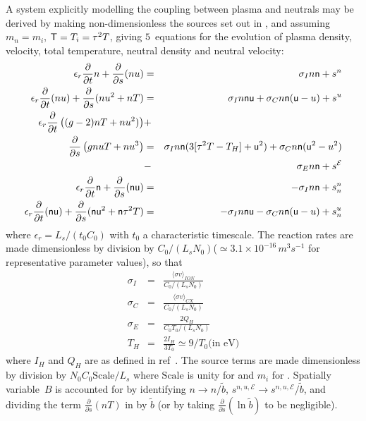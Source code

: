 A system explicitly modelling the coupling between plasma and neutrals may be derived by making
non-dimensionless the sources set out in , and assuming $m_n=m_i$, ${\sf T}=T_i=\tau^2 T$,
giving $5$~equations for the evolution of plasma density, velocity, total temperature,
neutral density and neutral velocity:
\begin{eqnarray}\label{eq:syscn}
\epsilon_r \frac{\partial}{\partial t} n + 
\frac{\partial}{\partial s} (nu)&=& \sigma_I n {\sf n}+ s^n\\
\epsilon_r \frac{\partial}{\partial t} (nu)+ 
\frac{\partial}{\partial s} (nu^2+nT)&=&
\sigma_I n {\sf n} {\sf u} + \sigma_C n {\sf n} ({\sf u}-u)+ s^u \label{eq:syscu}\\
\epsilon_r \frac{\partial}{\partial t}\left( (g-2) nT+
 nu^2) \right) &+& \nonumber\\
\frac{\partial}{\partial s} \left( g nuT +
nu^3 \right) &=& \sigma_I n {\sf n} (3[\tau^2 T -T_H]+{\sf u}^2)
+\sigma_C n {\sf n} ({\sf u}^2-u^2) \nonumber\\
&-&\sigma_E n {\sf n}
+ s^\mathcal{E} \label{eq:sysct}\\
\epsilon_r \frac{\partial}{\partial t} {\sf n} + 
\frac{\partial}{\partial s} ({\sf n} {\sf u})&=& -\sigma_I n {\sf n}+s^n_n\label{eq:syscnn}\\
\epsilon_r \frac{\partial}{\partial t} ({\sf n} {\sf u})+ 
\frac{\partial}{\partial s} ({\sf n} {\sf u}^2+{\sf n} \tau^2 T)&=&
-\sigma_I n {\sf n} {\sf u} - \sigma_C n {\sf n} ({\sf u}-u) +s^u_n \label{eq:syscnu}
\end{eqnarray}
where $\epsilon_r=L_s/(t_0 C_0)$ with $t_0$ a characteristic timescale. The reaction rates
are made dimensionless by division by $C_0/(L_s N_0)$($\simeq 3.1 \times 10^{-16}\,m^3 s^{-1}$ for
representative parameter values), so that
\begin{eqnarray}\label{eq:csigma}
\sigma_I &=& \frac{\langle \sigma v \rangle_{ION}}{C_0/(L_s N_0)}\\
\sigma_C &=& \frac{\langle \sigma v \rangle_{CX}}{C_0/(L_s N_0)}\\
\sigma_E &=& \frac{2 Q_H}{C_0 T_0/(L_s N_0)}\\
T_H&=&\frac{2 I_H}{3 T_0} \simeq 9/T_0 \mbox{(in eV)}
\end{eqnarray}
where $I_H$ and $Q_H$ are as defined in ref~\cite{Ha13Benc}.
The source terms are made dimensionless by division by $N_0 C_0 \mathrm{Scale}/L_s$
where $\mathrm{Scale}$ is unity for  and  $m_i$ for .
Spatially variable~$B$ is accounted for by identifying $n \rightarrow n/\tilde{b}$,
$s^{n,u,\mathcal{E}}\rightarrow s^{n,u,\mathcal{E}}/\tilde{b}$, and dividing
the term $\frac{\partial}{\partial s} (nT)$ in  by $\tilde{b}$
(or by taking $\frac{\partial}{\partial s} (\ln \tilde{b})$ to be negligible).

